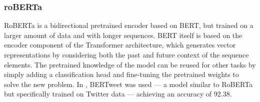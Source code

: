 \subsubsection{roBERTa}
RoBERTa is a bidirectional pretrained encoder based on BERT, but trained on a larger amount of data and with longer sequences. BERT itself is based on the encoder component of the Transformer architecture, which generates vector representations by considering both the past and future context of the sequence elements. The pretrained knowledge of the model can be reused for other tasks by simply adding a classification head and fine-tuning the pretrained weights to solve the new problem. In \cite{bonetti2021hate}, BERTweet was used — a model similar to RoBERTa but specifically trained on Twitter data — achieving an accuracy of 92.38.